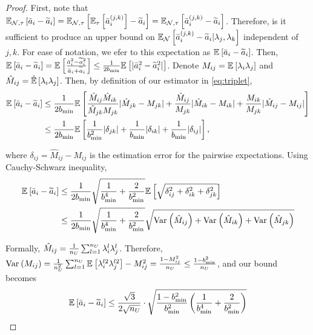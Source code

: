 \begin{proof}
First, note that $\mathbb{E}_{\mathcal{N}, \tau}\left[\bar{a}_i - \widetilde{a}_i\right] = \mathbb{E}_{\mathcal{N}, \tau}\left[\mathbb{E}_{\tau}\left[\bar{a}_i^{(j, k)}\right] - \widetilde{a}_i\right] = \mathbb{E}_{\mathcal{N}, \tau}\left[\bar{a}_i^{(j, k)} - \widetilde{a}_i\right]$. Therefore, is it sufficient to produce an upper bound on $\mathbb{E}_{\mathcal{N}}\left[\bar{a}_i^{(j, k)} - \widetilde{a}_i | \lambda_j, \lambda_k\right]$ independent of $j, k$. For ease of notation, we efer to this expectation as $\mathbb{E}_{}\left[\bar{a}_i - \widetilde{a}_i\right]$. Then, $\mathbb{E}_{}\left[\bar{a}_i - \widetilde{a}_i\right] = \mathbb{E}_{}\left[ \frac{\bar{a}_i^2 - \widetilde{a}_i^2}{\bar{a}_i + \widetilde{a}_i} \right] \le  \frac{1}{2b_{\min}} \mathbb{E}_{}\left[|\bar{a}_i^2 - \widetilde{a}_i^2 |\right]$. Denote $M_{ij} = \mathbb{E}_{}\left[\lambda_i \lambda_j\right]$ and $\hat{M}_{ij} = \hat{\mathbb{E}}\left[\lambda_i \lambda_j\right]$. Then, by definition of our estimator in \eqref{eq:triplet},
\begin{align}
    \mathbb{E}_{}\left[\bar{a}_i - \widetilde{a}_i\right] &\le \frac{1}{2b_{\min}} \mathbb{E}_{}\left[\frac{\hat{M}_{ij} \hat{M}_{ik}}{\hat{M}_{jk} M_{jk}} |\hat{M}_{jk} - M_{jk}| + \frac{\hat{M}_{ij}}{M_{jk}}|\hat{M}_{ik} - M_{ik}| + \frac{M_{ik}}{M_{jk}} |\hat{M}_{ij} - M_{ij} | \right] \label{eq:M_decomposition} \\
    &\le \frac{1}{2b_{\min}} \mathbb{E}_{}\left[\frac{1}{b_{\min}^2} |\delta_{jk}| + \frac{1}{b_{\min}} |\delta_{ik} | + \frac{1}{b_{\min}}|\delta_{ij} |\right],\nonumber
\end{align}

where $\delta_{ij} = \hat{M}_{ij} - M_{ij}$ is the estimation error for the pairwise expectations. Using Cauchy-Schwarz inequality,
\begin{align*}
    \mathbb{E}_{}\left[\bar{a}_i - \widetilde{a}_i\right] &\le \frac{1}{2b_{\min}} \sqrt{\frac{1}{b_{\min}^4} + \frac{2}{b_{\min}^2}} \mathbb{E}_{}\left[\sqrt{\delta_{ij}^2 + \delta_{ik}^2 + \delta_{jk}^2}\right] \\
    &\le \frac{1}{2b_{\min}} \sqrt{\frac{1}{b_{\min}^4} + \frac{2}{b_{\min}^2}} \sqrt{\mathrm{Var}_{}\left(\hat{M}_{ij}\right) + \mathrm{Var}_{}\left(\hat{M}_{ik}\right) + \mathrm{Var}_{}\left(\hat{M}_{jk}\right)} 
\end{align*}

Formally, $\hat{M}_{ij} = \frac{1}{n_U} \sum_{l = 1}^{n_U} \lambda_i^l \lambda_j^l$. Therefore, $\mathrm{Var}_{}\left(M_{ij}\right) = \frac{1}{n_U^2} \sum_{l = 1}^{n_U} \mathbb{E}_{}\left[\lambda_i^{l2} \lambda_j^{l2}\right] - M_{ij}^2 = \frac{1 - M_{ij}^2}{n_U} \le \frac{1 - b_{\min}^2}{n_U}$, and our bound becomes
\begin{align*}
    \mathbb{E}_{}\left[\bar{a}_i - \widetilde{a}_i\right] \le \frac{\sqrt{3}}{2\sqrt{n_U}} \cdot \sqrt{\frac{1 - b_{\min}^2}{b_{\min}^2} \left(\frac{1}{b_{\min}^4} + \frac{2}{b_{\min}^2} \right)}
\end{align*}



\end{proof}
